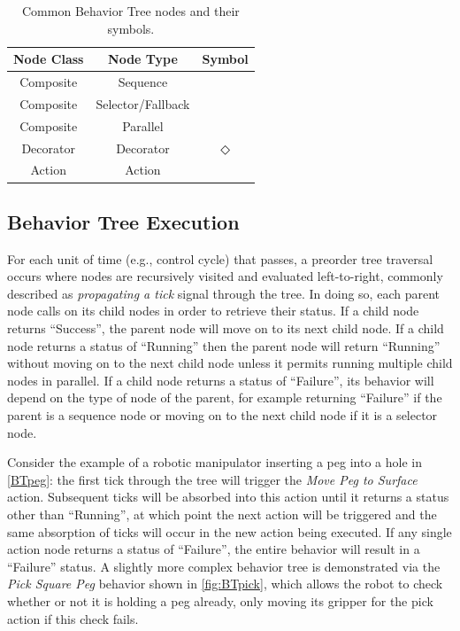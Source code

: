 \begin{table}[h!]
	\centering
	\begin{tabular}{ |c c c| }
		\hline
		Node Class & Node Type & Symbol \\
		\hline
		Composite & Sequence & \fbox{$\rightarrow$} \\
		Composite & Selector/Fallback & \fbox{?} \\
		Composite & Parallel & \fbox{$\rightrightarrows$} \\
		Decorator & Decorator & $\Diamond$ \\
		Action & Action & \fbox{Text} \\
		\hline
	\end{tabular}
	\caption{Common Behavior Tree nodes and their symbols.}
\end{table}

\subsection{Behavior Tree Execution}

For each unit of time (e.g., control cycle) that passes, a preorder tree traversal occurs where nodes are recursively visited and evaluated left-to-right, commonly described as \textsl{propagating a tick} signal through the tree. In doing so, each parent node calls on its child nodes in order to retrieve their status. If a child node returns ``Success'', the parent node will move on to its next child node. If a child node returns a status of ``Running'' then the parent node will return ``Running'' without moving on to the next child node unless it permits running multiple child nodes in parallel. If a child node returns a status of ``Failure'', its behavior will depend on the type of node of the parent, for example returning ``Failure'' if the parent is a sequence node or moving on to the next child node if it is a selector node.

Consider the example of a robotic manipulator inserting a peg into a hole in \cref{BTpeg}: the first tick through the tree will trigger the \textsl{Move Peg to Surface} action. Subsequent ticks will be absorbed into this action until it returns a status other than ``Running'', at which point the next action will be triggered and the same absorption of ticks will occur in the new action being executed. If any single action node returns a status of ``Failure'', the entire behavior will result in a ``Failure'' status. A slightly more complex behavior tree is demonstrated via the \textsl{Pick Square Peg} behavior shown in \cref{fig:BTpick}, which allows the robot to check whether or not it is holding a peg already, only moving its gripper for the pick action if this check fails.

